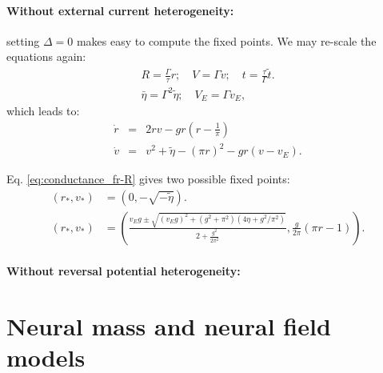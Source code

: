\paragraph{Without external current heterogeneity:}  setting $\Delta =
0$ makes easy to compute the fixed points. We may re-scale the equations
again:
\begin{eqnarray}
\label{eq:3}
R = \frac{\Gamma}{\tau} r; \quad V =  \Gamma v; \quad t =
\frac{\tau}{\Gamma}\tilde{t}. \\
\bar{\eta} = \Gamma^2 \tilde{\eta}; \quad
V_E = \Gamma v_E, \nonumber
\end{eqnarray}
which leads to:
\begin{subequations}
\label{eq:conductance_fr-rescaled2}
\begin{eqnarray}
\label{eq:conductance_fr-R-r-2}
\dot r & = & 2 rv - g r \left( r
                  - \frac{1}{\pi}\right) \\
  \label{eq:conductance_fr-V-r-2}
\dot v & = & v^2 + \tilde{\eta} - \left( \pi  r \right)^2 - g
                  r \left( v - v_E \right).
\end{eqnarray}
\end{subequations}




 Eq. \eqref{eq:conductance_fr-R} gives two possible fixed
points:
\begin{subequations}
  \label{eq:qif-cond-fixed}
  \begin{align}
    \label{eq:qif-cond-fixed1}
    \left(r_{*}, v_{*} \right) &=\left( 0, - \sqrt{-\tilde \eta} \right).\\
    \label{eq:qif-cond-fixed2}
    \left(r_{*}, v_{*} \right) &=\left(\frac{v_Eg \pm \sqrt{\left( v_Eg \right)^2 + \left( g^2 + \pi^2
        \right)\left( 4\eta + g^2/\pi^2 \right)}}{2 +
      \frac{g^2}{2\pi^2}},  \frac{g}{2\pi} \left( \pi r - 1 \right) \right).
  \end{align}
\end{subequations}

\paragraph{Without reversal potential heterogeneity:} 

\section{Neural mass and neural field models}

